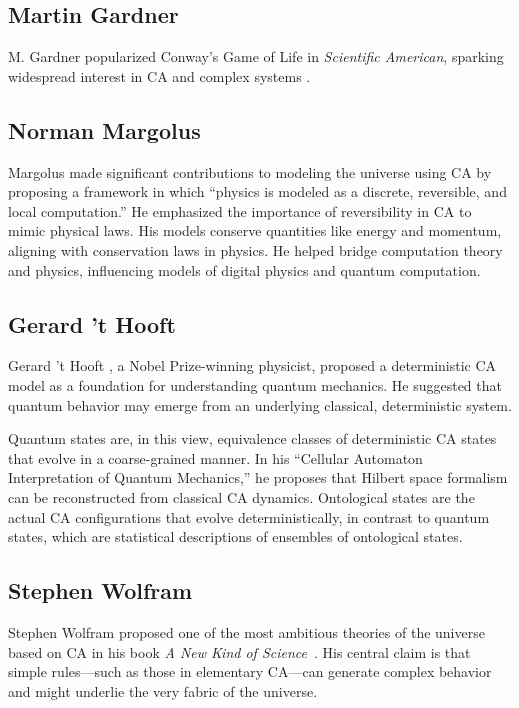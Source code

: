 \documentclass[12pt,english]{article}
\begin{document}
\subsection*{Martin Gardner}
M. Gardner popularized Conway’s Game of Life in \emph{Scientific American}, sparking widespread interest in CA and complex systems \cite{gardner1970}.

\subsection*{Norman Margolus}
Margolus \cite{margolus} made significant contributions to modeling the universe using CA by proposing a framework in which ``physics is modeled as a discrete, reversible, and local computation.'' He emphasized the importance of reversibility in CA to mimic physical laws. His models conserve quantities like energy and momentum, aligning with conservation laws in physics. He helped bridge computation theory and physics, influencing models of digital physics and quantum computation.

\subsection*{Gerard 't Hooft}
Gerard 't Hooft \cite{thooft}, a Nobel Prize-winning physicist, proposed a deterministic CA model as a foundation for understanding quantum mechanics. He suggested that quantum behavior may emerge from an underlying classical, deterministic system.

Quantum states are, in this view, equivalence classes of deterministic CA states that evolve in a coarse-grained manner. In his ``Cellular Automaton Interpretation of Quantum Mechanics,'' he proposes that Hilbert space formalism can be reconstructed from classical CA dynamics. Ontological states are the actual CA configurations that evolve deterministically, in contrast to quantum states, which are statistical descriptions of ensembles of ontological states.

\subsection*{Stephen Wolfram}
Stephen Wolfram proposed one of the most ambitious theories of the universe based on CA in his book \emph{A New Kind of Science}~\cite{wolfram}. His central claim is that simple rules—such as those in elementary CA—can generate complex behavior and might underlie the very fabric of the universe.
\end{document}
